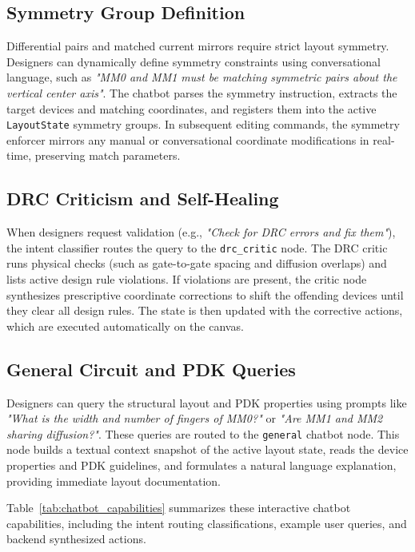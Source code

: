 \subsection{Symmetry Group Definition}
Differential pairs and matched current mirrors require strict layout symmetry. Designers can dynamically define symmetry constraints using conversational language, such as \textit{"MM0 and MM1 must be matching symmetric pairs about the vertical center axis"}.
The chatbot parses the symmetry instruction, extracts the target devices and matching coordinates, and registers them into the active \texttt{LayoutState} symmetry groups. In subsequent editing commands, the symmetry enforcer mirrors any manual or conversational coordinate modifications in real-time, preserving match parameters.

\subsection{DRC Criticism and Self-Healing}
When designers request validation (e.g., \textit{"Check for DRC errors and fix them"}), the intent classifier routes the query to the \texttt{drc\_critic} node. 
The DRC critic runs physical checks (such as gate-to-gate spacing and diffusion overlaps) and lists active design rule violations. If violations are present, the critic node synthesizes prescriptive coordinate corrections to shift the offending devices until they clear all design rules. The state is then updated with the corrective actions, which are executed automatically on the canvas.

\subsection{General Circuit and PDK Queries}
Designers can query the structural layout and PDK properties using prompts like \textit{"What is the width and number of fingers of MM0?"} or \textit{"Are MM1 and MM2 sharing diffusion?"}.
These queries are routed to the \texttt{general} chatbot node. This node builds a textual context snapshot of the active layout state, reads the device properties and PDK guidelines, and formulates a natural language explanation, providing immediate layout documentation.

Table~\ref{tab:chatbot_capabilities} summarizes these interactive chatbot capabilities, including the intent routing classifications, example user queries, and backend synthesized actions.

